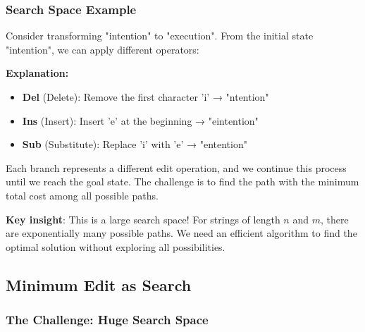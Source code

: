 \documentclass[11pt,a4paper]{article}
\theoremstyle{definition}
\theoremstyle{plain}
\theoremstyle{remark}
\begin{document}
\subsubsection{Search Space Example}

Consider transforming "intention" to "execution". From the initial state "intention", we can apply different operators:

\begin{center}
\end{center}

\textbf{Explanation:}
\begin{itemize}
    \item \textbf{Del} (Delete): Remove the first character 'i' → "ntention"
    \item \textbf{Ins} (Insert): Insert 'e' at the beginning → "eintention"
    \item \textbf{Sub} (Substitute): Replace 'i' with 'e' → "entention"
\end{itemize}

Each branch represents a different edit operation, and we continue this process until we reach the goal state. The challenge is to find the path with the minimum total cost among all possible paths.

\textbf{Key insight}: This is a large search space! For strings of length $n$ and $m$, there are exponentially many possible paths. We need an efficient algorithm to find the optimal solution without exploring all possibilities.

\subsection{Minimum Edit as Search}

\subsubsection{The Challenge: Huge Search Space}
\end{document}
